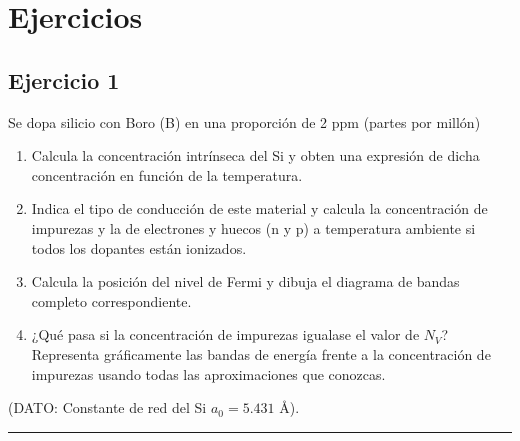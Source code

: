 
\section{Ejercicios}

\subsection{Ejercicio 1}


	Se dopa silicio con Boro (B) en una proporción de 2 ppm (partes por millón)
	\begin{enumerate}[label=\alph*)]
		\item Calcula la concentración intrínseca del Si y obten una expresión de dicha concentración en función de la temperatura.
		\item Indica el tipo de conducción de este material y calcula la concentración de impurezas y la de electrones y huecos (n y p) a temperatura ambiente si todos los dopantes están ionizados.
		\item Calcula la posición del nivel de Fermi y dibuja el diagrama de bandas completo correspondiente.
		\item ¿Qué pasa si la concentración de impurezas igualase el valor de \( N_V \)? Representa gráficamente las bandas de energía frente a la concentración de impurezas usando todas las aproximaciones que conozcas.
	\end{enumerate}
	(DATO: Constante de red del Si \( a_0 = 5.431 \) Å).


\rule{\textwidth}{0.1pt} \\[2pt]

